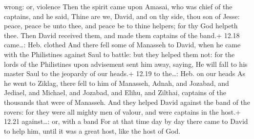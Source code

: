 wrong: or, violence  Then the spirit came upon Amasai, who
was chief of the captains, and he said, Thine are we, David, and on thy
side, thou son of Jesse: peace, peace be unto thee, and peace be to
thine helpers; for thy God helpeth thee. Then David received them, and
made them captains of the band.+ 12.18 came\ldots: Heb. clothed
 And there fell some of Manasseh to David, when he came
with the Philistines against Saul to battle: but they helped them not:
for the lords of the Philistines upon advisement sent him away, saying,
He will fall to his master Saul to the jeopardy of our heads.+ 12.19 to
the\ldots: Heb. on our heads  As he went to Ziklag, there
fell to him of Manasseh, Adnah, and Jozabad, and Jediael, and Michael,
and Jozabad, and Elihu, and Zilthai, captains of the thousands that were
of Manasseh.  And they helped David against the band of the
rovers: for they were all mighty men of valour, and were captains in the
host.+ 12.21 against\ldots: or, with a band  For at that
time day by day there came to David to help him, until it was a great
host, like the host of God.


